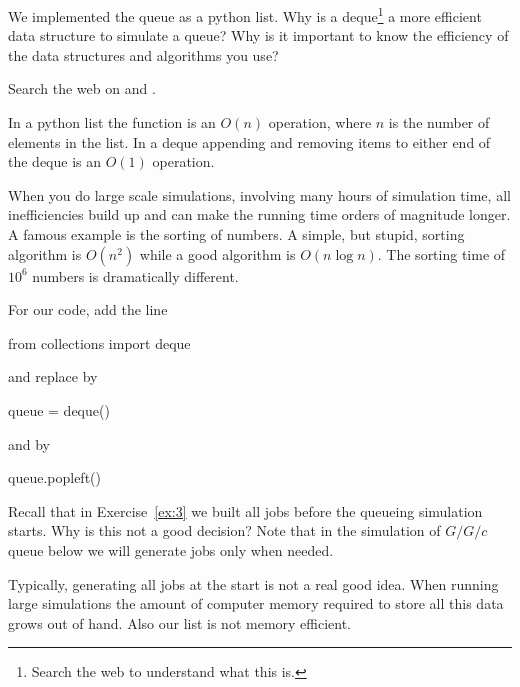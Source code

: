 \begin{exercise}

  We implemented the queue as a python list. Why is a deque\footnote{Search the web to understand what this is.} a more efficient data structure to simulate a queue?  Why is it important to know the efficiency of the data structures and algorithms you use?
  \begin{hint}
  Search the web on  and .
  \end{hint}
  \begin{solution}
    In a python list the  function is an $O(n)$ operation, where $n$ is the number of elements in the list. In a deque appending and removing items to either end of the deque is an $O(1)$ operation.

When you do large scale simulations, involving many hours of simulation time, all inefficiencies build up and can make the running time orders of magnitude longer. A famous example is the sorting of numbers. A simple, but stupid, sorting algorithm is $O(n^2)$ while a good algorithm is $O(n \log n)$. The sorting time of $10^6$ numbers is dramatically different. 

For our code, add the line
\begin{pyverbatim}
from collections import deque
\end{pyverbatim}
and replace  by
\begin{pyverbatim}
queue = deque()
\end{pyverbatim}
and   by
\begin{pyverbatim}
queue.popleft()
\end{pyverbatim}
  \end{solution}
\end{exercise}

\begin{exercise}
  Recall that in Exercise~\ref{ex:3} we built all jobs before the queueing simulation starts. Why is this not a good decision? Note that in the simulation of $G/G/c$ queue below we will generate jobs only when needed. 
  \begin{solution}
    Typically, generating all jobs at the start is not a real good idea. When running large simulations the amount of computer memory required to store all this data grows out of hand. Also our  list is not memory efficient. 
  \end{solution}
\end{exercise}


